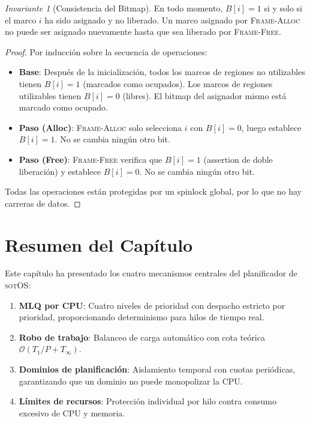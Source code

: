 \documentclass[11pt,twoside,openright]{book}
\theoremstyle{definition}
\theoremstyle{plain}
\theoremstyle{remark}
\newtheorem{invariant}{Invariante}[chapter]
\newcommand{\sotos}{\textsc{sotOS}}
\newcommand{\bigO}{\mathcal{O}}
\begin{document}
\begin{invariant}[Consistencia del Bitmap]
\label{inv:bitmap-consistency}
En todo momento, $B[i] = 1$ si y solo si el marco $i$ ha sido asignado y no liberado.
Un marco asignado por \textsc{Frame-Alloc} no puede ser asignado nuevamente hasta que
sea liberado por \textsc{Frame-Free}.
\end{invariant}

\begin{proof}
Por inducción sobre la secuencia de operaciones:
\begin{itemize}
    \item \textbf{Base}: Después de la inicialización, todos los marcos de regiones
          no utilizables tienen $B[i] = 1$ (marcados como ocupados). Los marcos de
          regiones utilizables tienen $B[i] = 0$ (libres). El bitmap del asignador
          mismo está marcado como ocupado.
    \item \textbf{Paso (Alloc)}: \textsc{Frame-Alloc} solo selecciona $i$ con $B[i] = 0$,
          luego establece $B[i] = 1$. No se cambia ningún otro bit.
    \item \textbf{Paso (Free)}: \textsc{Frame-Free} verifica que $B[i] = 1$ (assertion
          de doble liberación) y establece $B[i] = 0$. No se cambia ningún otro bit.
\end{itemize}
Todas las operaciones están protegidas por un spinlock global, por lo que no hay carreras
de datos.
\end{proof}

\section{Resumen del Capítulo}

Este capítulo ha presentado los cuatro mecanismos centrales del planificador de \sotos{}:

\begin{enumerate}
    \item \textbf{MLQ por CPU}: Cuatro niveles de prioridad con despacho estricto por
          prioridad, proporcionando determinismo para hilos de tiempo real.
    \item \textbf{Robo de trabajo}: Balanceo de carga automático con cota teórica
          $\bigO(T_1/P + T_\infty)$.
    \item \textbf{Dominios de planificación}: Aislamiento temporal con cuotas periódicas,
          garantizando que un dominio no puede monopolizar la CPU.
    \item \textbf{Límites de recursos}: Protección individual por hilo contra consumo
          excesivo de CPU y memoria.
\end{enumerate}
\end{document}
